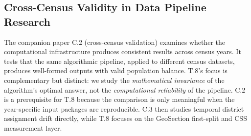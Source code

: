 \subsection{Cross-Census Validity in Data Pipeline Research}

The companion paper C.2 (cross-census validation) examines whether the
computational infrastructure produces consistent results across census years.
It tests that the same algorithmic pipeline, applied to different census
datasets, produces well-formed outputs with valid population balance.
T.8's focus is complementary but distinct: we study the \emph{mathematical
invariance} of the algorithm's optimal answer, not the \emph{computational
reliability} of the pipeline.
C.2 is a prerequisite for T.8 because the comparison is only meaningful when
the year-specific input packages are reproducible.  C.3 then studies temporal
district assignment drift directly, while T.8 focuses on the GeoSection
first-split and CSS measurement layer.
